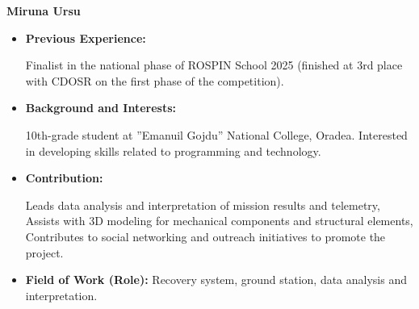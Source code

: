 \item[] \textbf{Miruna Ursu}
    \begin{itemize}[label=]
        \item[\faCogs] \textbf{Previous Experience:} 
            \begin{itemize}[label=]
                \myitemtwo Finalist in the national phase of ROSPIN School 2025 (finished at 3rd place with CDOSR on the first phase of the competition).
            \end{itemize}
        \item[\faGraduationCap] \textbf{Background and Interests:} 
            \begin{itemize}[label=\textbullet]
                \myitemtwo 10th-grade student at ”Emanuil Gojdu” National College, Oradea.
                \myitemtwo Interested in developing skills related to programming and technology.
            \end{itemize}
        \item[\faEdit] \textbf{Contribution:}
            \begin{itemize}[label=\textbullet]
                \myitemtwo Leads data analysis and interpretation of mission results and telemetry,
                \myitemtwo Assists with 3D modeling for mechanical components and structural elements,
                \myitemtwo Contributes to social networking and outreach initiatives to promote the project.
            \end{itemize}
        \item[\faMicroscope] \textbf{Field of Work (Role):} Recovery system, ground station, data analysis and interpretation.
    \end{itemize}
    \vspace{0.2 cm}
    
